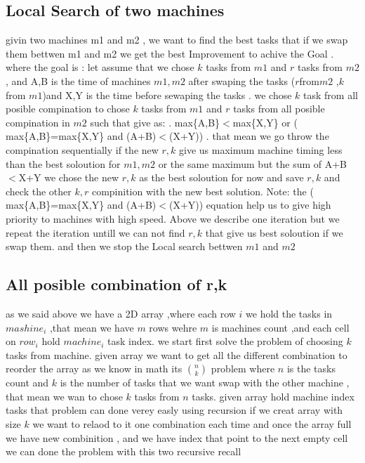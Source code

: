 \documentclass[a4paper,12pt]{report}
\begin{document}
\subsection{Local Search of two machines} 
givin two machines m1 and m2 , we want to find the best tasks that if we swap them bettwen m1 and m2 we get the best Improvement to achive the Goal .\newline
where the goal is :\newline
 let assume that we chose $k$ tasks from $m1$ and $r$ tasks from $m2$ ,  and A,B is the time of machines $m1,m2$ after swaping the tasks ($r $from$ m2$ ,$k$ from $m1$)and X,Y is the time before sewaping the tasks .\newline 
we chose $k$ task from all posible compination to chose $k$ tasks from $m1$ and $r$ tasks  from all posible compination in $m2$ such that give as: .\newline
   max\{A,B\}$<$max\{X,Y\}  or ( max\{A,B\}=max\{X,Y\}  and (A+B)$<$(X+Y)) .\newline
that mean we go throw the compination sequentially if the new  $r,k$ give us maximum machine timing less than the best soloution  for $m1,m2$ or the same maximum but the sum of A+B$<$X+Y we chose the new $r,k$ as the best soloution for now and save $r,k$ and check the other $k,r$   compinition with the new best solution.\newline
Note: the    ( max\{A,B\}=max\{X,Y\}  and (A+B)$<$(X+Y))  equation help us to give high priority to machines with high speed.\newline
Above we describe one iteration but we repeat the iteration untill we can not find $r,k$ that give us best soloution if we swap  them. and then we stop the Local search bettwen $m1$ and $m2$\newline
\subsection{All posible combination of r,k}
 as we said above we have a 2D array ,where  each row $i$ we hold the tasks in $mashine_i$ ,that mean we have $m$ rows wehre $m$ is machines count ,and each cell on $row_i$ hold $machine_i$ task index.\newline
we start first solve the problem of choosing $k$ tasks from machine. given array we want to get all the different combination to reorder the array as we know in math its $\binom{n}{k}$ problem where $n$ is the tasks count and $k$ is the number of tasks that we want swap with the
 other machine ,  that mean we wan to chose $k$ tasks from $n$ tasks.\newline 
given array hold machine index tasks that problem can done verey easly using recursion \newline
if we creat array with size $k$ we want to relaod to it one combination each time  and once the array full we have new combinition , and we have index that point to the next empty cell we can done the problem with this two recursive recall \newline
    
\end{document}
